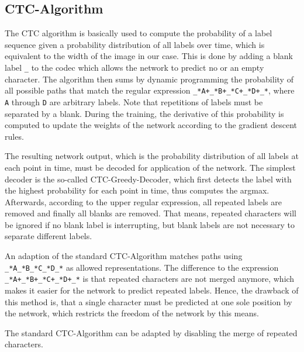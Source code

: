 \documentclass{jlcl}
\begin{document}
\subsection{CTC-Algorithm}
\label{sec:ctc-algorithm}
The CTC algorithm is basically used to compute the probability of a label sequence given a probability distribution of all labels over time, which is equivalent to the width of the image in our case.
This is done by adding a blank label \texttt{\_} to the codec which allows the network to predict no or an empty character.
The algorithm then sums by dynamic programming the probability of all possible paths that match the regular expression \texttt{\_*A+\_*B+\_*C+\_*D+\_*}, where \texttt{A} through \texttt{D} are arbitrary labels.
Note that repetitions of labels must be separated by a blank.
During the training, the derivative of this probability is computed to update the weights of the network according to the gradient descent rules.

The resulting network output, which is the probability distribution of all labels at each point in time, must be decoded for application of the network.
The simplest decoder is the so-called CTC-Greedy-Decoder, which first detects the label with the highest probability for each point in time, thus computes the argmax.
Afterwards, according to the upper regular expression, all repeated labels are removed and finally all blanks are removed.
That means, repeated characters will be ignored if no blank label is interrupting, but blank labels are not necessary to separate different labels.

An adaption of the standard CTC-Algorithm matches paths using \texttt{\_*A\_*B\_*C\_*D\_*} as allowed representations.
The difference to the expression \texttt{\_*A+\_*B+\_*C+\_*D+\_*} is that repeated characters are not merged anymore, which makes it easier for the network to predict repeated labels.
Hence, the drawback of this method is, that a single character must be predicted at one sole position by the network, which restricts the freedom of the network by this means.

The standard CTC-Algorithm can be adapted by disabling the merge of repeated characters.
\end{document}
